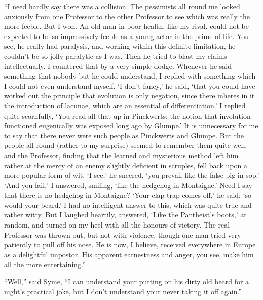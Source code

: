 \documentclass{book}
\begin{document}
“I need hardly say there was a collision. The pessimists all round me looked anxiously from one Professor to the other Professor to see which was really the more feeble. But I won. An old man in poor health, like my rival, could not be expected to be so impressively feeble as a young actor in the prime of life. You see, he really had paralysis, and working within this definite limitation, he couldn’t be so jolly paralytic as I was. Then he tried to blast my claims intellectually. I countered that by a very simple dodge. Whenever he said something that nobody but he could understand, I replied with something which I could not even understand myself. ‘I don’t fancy,’ he said, ‘that you could have worked out the principle that evolution is only negation, since there inheres in it the introduction of lacunae, which are an essential of differentiation.’ I replied quite scornfully, ‘You read all that up in Pinckwerts; the notion that involution functioned eugenically was exposed long ago by Glumpe.’ It is unnecessary for me to say that there never were such people as Pinckwerts and Glumpe. But the people all round (rather to my surprise) seemed to remember them quite well, and the Professor, finding that the learned and mysterious method left him rather at the mercy of an enemy slightly deficient in scruples, fell back upon a more popular form of wit. ‘I see,’ he sneered, ‘you prevail like the false pig in sop.’ ‘And you fail,’ I answered, smiling, ‘like the hedgehog in Montaigne.’ Need I say that there is no hedgehog in Montaigne? ‘Your clap-trap comes off,’ he said; ‘so would your beard.’ I had no intelligent answer to this, which was quite true and rather witty. But I laughed heartily, answered, ‘Like the Pantheist’s boots,’ at random, and turned on my heel with all the honours of victory. The real Professor was thrown out, but not with violence, though one man tried very patiently to pull off his nose. He is now, I believe, received everywhere in Europe as a delightful impostor. His apparent earnestness and anger, you see, make him all the more entertaining.”

“Well,” said Syme, “I can understand your putting on his dirty old beard for a night’s practical joke, but I don’t understand your never taking it off again.”
\end{document}
